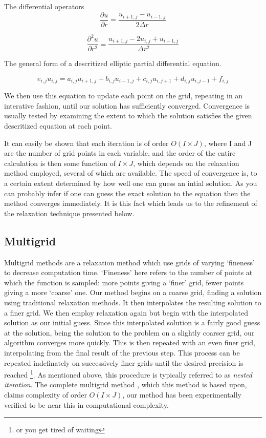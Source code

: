 \documentclass{article}
\begin{document}
The differential operators
\begin{equation}
\frac{\partial u}{\partial r} = \frac{u_{i+1, j} - u_{i-1, j}}{2\Delta r}
\end{equation}

\begin{equation}
\frac{\partial^{2} u}{\partial r^{2}} =
\frac{u_{i+1,j} - 2 u_{i,j} +u_{i-1,j}}{\Delta r^{2}}
\end{equation}

The general form of a descritized elliptic partial differential equation.

\begin{equation}
 e_{i,j} u_{i, j} = a_{i,j} u_{i+1, j} + b_{i,j} u_{i-1, j} +
 c_{i,j} u_{i, j+1} + d_{i,j} u_{i, j-1} +f_{i,j}
\end{equation}

We then use this equation to update each point on the grid, repeating in an
interative fashion, until our solution has sufficiently converged. Convergence
is usually tested by examining the extent to which the solution satisfies the
given descritized equation at each point.

It can easily be shown that each iteration is of
order $O(I\times J)$, where I and J are the number of grid points in each
variable, and the order of the entire calculation is then some function
of $I\times J$, which depends on the relaxation method employed, several
of which are available. The speed of convergence is, to a certain extent determined by how well one
 can guess an intial solution. As you can probably infer if one can guess the
 exact solution to the equation then the method converges immediately. It is
 this fact which leads us to the refinement of the relaxation technique
 presented below.

\subsection{Multigrid}
Multigrid methods are a relaxation method which use grids of varying
`fineness' to decrease computation time. `Fineness' here refers to the number
of points at which the function is sampled: more points giving a `finer' grid,
fewer points giving a more `coarse' one.
Our method begins on a coarse grid, finding a solution using traditional
relaxation methods. It then interpolates the resulting solution
to a finer grid. We then employ relaxation again but begin with the interpolated
solution as our initial guess. Since this interpolated solution is a fairly good
guess at the solution, being the solution to the problem on a slightly coarser
grid, our algorithm converges more quickly. This is then repeated with an even
finer grid, interpolating
from the final result of the previous step. This process can be repeated
indefinately on successively finer grids until the desired precision is reached
\footnote{or you get tired of waiting}. As mentioned above, this procedure is
typically referred to as \emph{nested iteration}. The complete multigrid method
, which this method is based upon, claims complexity of order $O(I\times J)$,
our method has been experimentally verified to be near this in computational
complexity.\cite{3}
\end{document}
